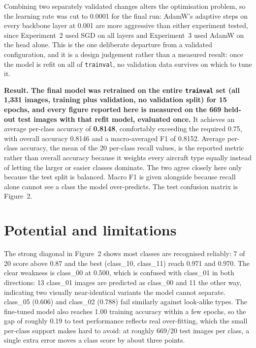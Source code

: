 \documentclass[10pt,a4paper,twocolumn]{article}
\begin{document}
Combining two separately validated changes alters the optimisation problem, so the learning rate
was cut to 0.0001 for the final run: AdamW's adaptive steps on every backbone layer at 0.001 are
more aggressive than either experiment tested, since Experiment~2 used SGD on all layers and
Experiment~3 used AdamW on the head alone. This is the one deliberate departure from a validated
configuration, and it is a design judgement rather than a measured result: once the model is
refit on all of \texttt{trainval}, no validation data survives on which to tune it.

\textbf{Result.} \textbf{The final model was retrained on the entire \texttt{trainval} set (all
1,331 images, training plus validation, no validation split) for 15 epochs, and
every figure reported here is measured on the 669 held-out test images with that refit model,
evaluated once.} It achieves an average per-class accuracy of \textbf{0.8148}, comfortably
exceeding the required 0.75, with overall accuracy 0.8146 and a macro-averaged F1 of 0.8152.
Average per-class accuracy, the mean of the 20 per-class recall values, is the
reported metric rather than overall accuracy because it weights every aircraft type equally
instead of letting the larger or easier classes dominate. The two agree closely here only because
the test split is balanced. Macro F1 is given alongside because recall alone cannot see a class
the model over-predicts. The test confusion matrix is Figure~2.

\section{Potential and limitations}
The strong diagonal in Figure~2 shows most classes are recognised reliably: 7 of
20 score above 0.87 and the best (class\_10, class\_11) reach 0.971 and 0.970. The
clear weakness is class\_00 at 0.500, which is confused with class\_01 in both directions:
13 class\_01 images are predicted as class\_00 and 11 the other way, indicating two
visually near-identical variants the model cannot separate. class\_05 (0.606) and class\_02
(0.788) fail similarly against look-alike types. The fine-tuned model also reaches
1.00 training accuracy within a few epochs, so the gap of roughly 0.19 to test performance
reflects real over-fitting, which the small per-class support makes hard to avoid: at roughly
669$/$20 test images per class, a single extra error moves a class score by about
three points.
\end{document}
